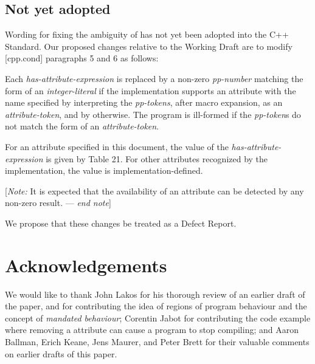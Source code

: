 \subsection{Not yet adopted}

Wording for fixing the ambiguity of  has not yet been adopted into the C++ Standard. Our proposed changes relative to the Working Draft \cite{N4944} are to modify [cpp.cond] paragraphs 5 and 6 as follows:

\begin{adjustwidth}{0.5cm}{0.5cm}
Each \emph{has-attribute-expression} is replaced by a non-zero \emph{pp-number} matching the form of an \emph{integer-literal} if the implementation supports an attribute with the name specified by interpreting the \emph{pp-tokens}, after macro expansion, as an \emph{attribute-token}, and by  otherwise. The program is ill-formed if the \emph{pp-token}s do not match the form of an \emph{attribute-token}.

For an attribute specified in this document, the value of the \emph{has-attribute-expression} is given by Table 21. For other attributes recognized by the implementation, the value is implementation-defined.

[\emph{Note:} It is expected that the availability of an attribute can be detected by any non-zero result. --- \emph{end note}] 
\end{adjustwidth}

We propose that these changes be treated as a Defect Report.

\section*{Acknowledgements}
We would like to thank John Lakos for his thorough review of an earlier draft of the paper, and for contributing the idea of regions of program behaviour and the concept of \emph{mandated behaviour}; Corentin Jabot for contributing the code example where removing a \mbox{} attribute can cause a program to stop compiling; and Aaron Ballman, Erich Keane, Jens Maurer, and Peter Brett for their valuable comments on earlier drafts of this paper.

\renewcommand{\bibname}{References}



